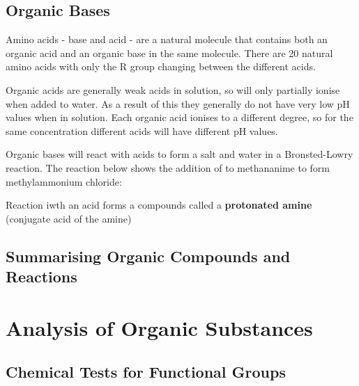 		\begin{center}
		\end{center}

	\subsection{Organic Bases}
		
		Amino acids - base and acid - are a natural molecule that contains both an organic acid and an organic base in the same molecule. There are 20 natural amino acids with only the R group changing between the different acids.

		\begin{center}
		\end{center}

		Organic acids are generally weak acids in solution, so will only partially ionise when added to water. As a result of this they generally do not have very low pH values when in solution. Each organic acid ionises to a different degree, so for the same concentration different acids will have different pH values.

		Organic bases will react with acids to form a salt and water in a Bronsted-Lowry reaction. The reaction below shows the addition of  to methananime to form methylammonium chloride:

		\begin{center}
		\end{center}

		Reaction iwth an acid forms a compounds called a \textbf{protonated amine} (conjugate acid of the amine)

	\subsection{Summarising Organic Compounds and Reactions}
	
\section{Analysis of Organic Substances} \label{28/05/2025}

	\subsection{Chemical Tests for Functional Groups}


